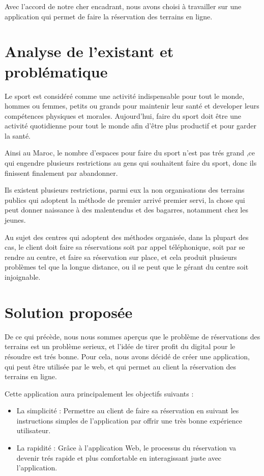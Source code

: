 \documentclass[a4paper]{report}
\begin{document}
\begin{spacing}{2}
Avec l'accord de notre cher encadrant, nous avons choisi à travailler sur une application qui permet de faire la réservation des terrains en ligne. 

\section{Analyse de l'existant et problématique}

\par 
Le sport est considéré comme une activité indispensable pour tout le monde, hommes ou femmes, petits ou grands pour maintenir leur santé et developer leurs compétences physiques et morales. Aujourd'hui, faire du sport doit être une activité quotidienne pour tout le monde afin d'être plus productif et pour garder la santé. 

Ainsi au Maroc, le nombre d'espaces pour faire du sport n'est pas trés grand ,ce qui engendre plusieurs restrictions au gens qui souhaitent faire du sport, donc ils finissent finalement par abandonner.

Ils existent plusieurs restrictions, parmi eux la non organisations des terrains publics qui adoptent la méthode de premier arrivé premier servi, la chose qui peut donner naissance à des malentendus et des bagarres, notamment chez les jeunes.

Au sujet des centres qui adoptent des méthodes organisée, dans la plupart des cas, le client doit faire sa réservations soit par appel téléphonique, soit par se rendre au centre, et faire sa réservation sur place, et cela produit plusieurs problèmes tel que la longue distance, ou il se peut que le gérant du centre soit injoignable. 

\section{Solution proposée}

De ce qui précède, nous nous sommes aperçus que le problème de réservations des terrains est un problème serieux, et l'idée  de tirer profit du digital pour le résoudre est trés bonne. Pour cela, nous avons décidé de créer une application, qui peut être utilisée par le web, et qui permet au client la réservation des terrains en ligne.


Cette application aura principalement les objectifs suivants :


\begin{itemize}
\item La simplicité : Permettre au client de faire sa réservation en suivant les instructions simples de l'application par offrir une très bonne expérience utilisateur.  
\item La rapidité : Grâce à l'application Web, le processus du réservation va devenir trés rapide et plus comfortable en interagissant juste avec l'application. 


\end{itemize}
\end{spacing}
\end{document}
